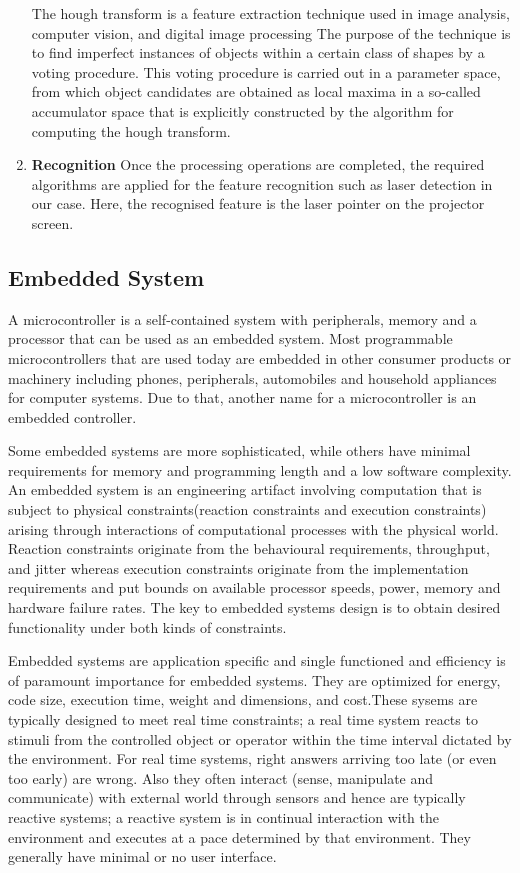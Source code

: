 \documentclass[12pt, a4paper]{article}
\begin{document}
\begin{enumerate}
The hough transform is a feature extraction technique
used in image analysis, computer vision, and digital image processing The purpose
of the technique is to find imperfect instances of objects within a certain class of
shapes by a voting procedure. This voting procedure is carried out in a parameter
space, from which object candidates are obtained as local maxima in a so-called
accumulator space that is explicitly constructed by the algorithm for computing the
hough transform.

\item \textbf{Recognition}
Once the  processing operations are completed, the required algorithms are applied for the feature recognition such as laser detection in our case. Here, the recognised feature is the laser pointer on the projector screen.
\end{enumerate}

\subsection{Embedded System}
A microcontroller is a self-contained system with peripherals, memory and a processor that can be used as an embedded system. Most programmable microcontrollers that are used today are embedded in other consumer products or machinery including phones, peripherals, automobiles and household appliances for computer systems. Due to that, another name for a microcontroller is an embedded controller.

Some embedded systems are more sophisticated, while others have minimal requirements for memory and programming length and a low software complexity. An embedded system is an engineering artifact involving computation that is subject to physical constraints(reaction constraints and execution constraints) arising through interactions of computational processes with the physical world. Reaction constraints originate from the behavioural requirements, throughput, and jitter whereas execution constraints originate from the implementation requirements and put bounds on available processor speeds, power, memory and hardware failure rates. The key to embedded systems design is to obtain desired functionality under both kinds of constraints. 

Embedded systems are application specific and single functioned and efficiency is of paramount importance for embedded systems. They are optimized for energy, code size, execution time, weight and dimensions, and cost.These sysems are typically designed to meet real time constraints; a real time system reacts to stimuli from the controlled object or operator within the time interval dictated by the environment. For real time systems, right answers arriving too late (or even too early) are wrong. Also they often interact (sense, manipulate and communicate) with external world through sensors and hence are typically reactive systems; a reactive system is in continual interaction with the environment and executes at a pace determined by that environment.
They generally have minimal or no user interface. 
\end{document}
